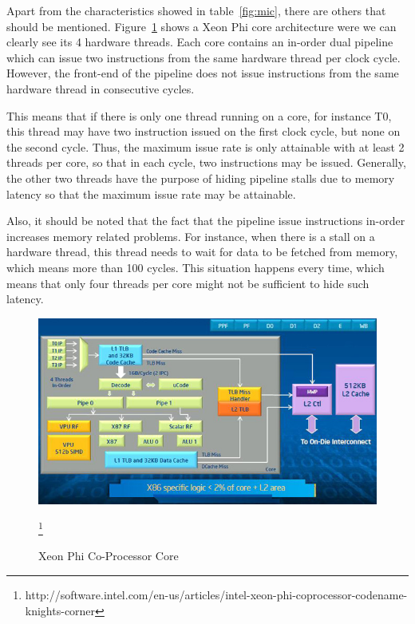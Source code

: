 \documentclass[abstract=on,9pt,twocolumn]{scrartcl}
\begin{document}
Apart from the characteristics showed in table~\ref{fig:mic}, there are
others that should be mentioned. Figure~\ref{img:phi_arch} shows a Xeon
Phi core architecture were we can clearly see its 4 hardware threads. Each core contains an
in-order dual pipeline which can issue two instructions from the same
hardware thread per clock cycle. However, the front-end of the pipeline
does not issue instructions from the same hardware thread in consecutive
cycles.\cite{Cepeda:PhiPerformance}

This means that if there is only one thread running on a core, for
instance T0, this thread may have two instruction issued on the first
clock cycle, but none on the second cycle. Thus, the maximum issue rate
is only attainable with at least 2 threads per core, so that in each
cycle, two instructions may be issued. Generally, the other two threads
have the purpose of hiding pipeline stalls due to memory latency so that
the maximum issue rate may be attainable.

Also, it should be noted that the fact that the pipeline issue
instructions in-order increases memory related problems. For instance,
when there is a stall on a hardware thread, this thread needs to wait
for data to be fetched from memory, which means more than 100 cycles.
This situation happens every time, which means that only four threads
per core might not be sufficient to hide such latency.

\begin{center}
\begin{figure}[htb]
    \includegraphics[width=\columnwidth]{img/phi_arch.jpg}
    \caption{Xeon Phi Co-Processor
    Core}\footnote{http://software.intel.com/en-us/articles/intel-xeon-phi-coprocessor-codename-knights-corner}
    \label{img:phi_arch}
\end{figure}
\end{center}
\end{document}
